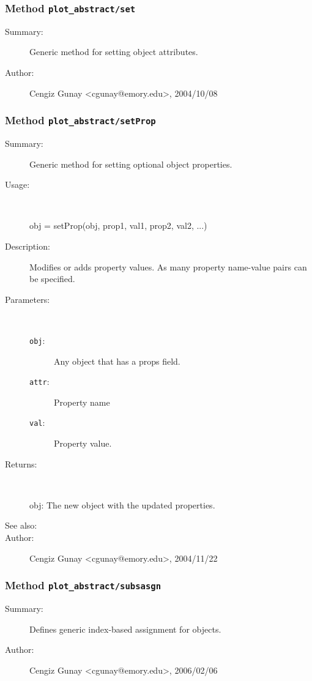 \subsubsection[Method \texttt{set}]{Method \texttt{plot\_abstract/set}}%
%
\label{ref_plot_abstract__set}%
\hypertarget{ref_plot_abstract__set}{}%
\begin{description}
\item[Summary:]Generic method for setting object attributes.
%
%
%
%
%
%
%
\item[Author:]%
Cengiz Gunay <cgunay@emory.edu>, 2004/10/08
%
\end{description}
\methodline%
\subsubsection[Method \texttt{setProp}]{Method \texttt{plot\_abstract/setProp}}%
%
\label{ref_plot_abstract__setProp}%
\hypertarget{ref_plot_abstract__setProp}{}%
\begin{description}
\item[Summary:]Generic method for setting optional object properties.
%
\item[Usage:]~%
\begin{lyxcode}%
obj = setProp(obj, prop1, val1, prop2, val2, ...)
%
\end{lyxcode}%
%
\item[Description:]%
Modifies or adds property values. As many property name-value 
 pairs can be specified.
\item[Parameters:]~
\begin{description}%
\item[\texttt{obj}:]
 Any object that has a props field.
\item[\texttt{attr}:]
 Property name
\item[\texttt{val}:]
 Property value.
\end{description}%
%
\item[Returns:
]~

	obj: The new object with the updated properties.
%
%
\item[See also:]%
%
\item[Author:]%
Cengiz Gunay <cgunay@emory.edu>, 2004/11/22
%
\end{description}
\methodline%
\subsubsection[Method \texttt{subsasgn}]{Method \texttt{plot\_abstract/subsasgn}}%
%
\label{ref_plot_abstract__subsasgn}%
\hypertarget{ref_plot_abstract__subsasgn}{}%
\begin{description}
\item[Summary:]Defines generic index-based assignment for objects.
%
%
%
%
%
%
%
\item[Author:]%
Cengiz Gunay <cgunay@emory.edu>, 2006/02/06
%
\end{description}
\methodline%
